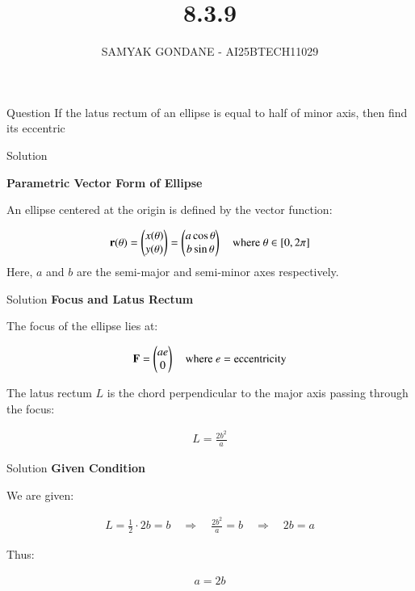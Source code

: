 \documentclass{beamer}
\title 
{8.3.9}
\date{}
\author
{SAMYAK GONDANE - AI25BTECH11029}
\begin{document}
\frame{\titlepage}

\begin{frame}{Question}
If the latus rectum of an ellipse is equal to half of minor axis, then find its eccentric
\end{frame}

\begin{frame}{Solution}

\textbf{Parametric Vector Form of Ellipse}

An ellipse centered at the origin is defined by the vector function:


\begin{align}
\mathbf{r}(\theta) =
\begin{pmatrix}
x(\theta) \\
y(\theta)
\end{pmatrix}
=
\begin{pmatrix}
a \cos \theta \\
b \sin \theta
\end{pmatrix}
\quad \text{where } \theta \in [0, 2\pi]
\end{align}
Here, $a$ and $b$ are the semi-major and semi-minor axes respectively.
\end{frame}



\begin{frame}{Solution}
\textbf{Focus and Latus Rectum}

The focus of the ellipse lies at:


\begin{align}
\mathbf{F} = 
\begin{pmatrix}
ae \\
0
\end{pmatrix}
\quad \text{where } e = \text{eccentricity}
\end{align}


The latus rectum $L$ is the chord perpendicular to the major axis passing through the focus:

\begin{align}
L = \frac{2b^2}{a}
\end{align}
\end{frame}


\begin{frame}{Solution}
\textbf{Given Condition}

We are given:


\begin{align}
L = \frac{1}{2} \cdot 2b = b
\quad \Rightarrow \quad \frac{2b^2}{a} = b
\quad \Rightarrow \quad 2b = a
\end{align}

Thus:

\begin{align}
a = 2b
\end{align}
\end{frame}
\end{document}
